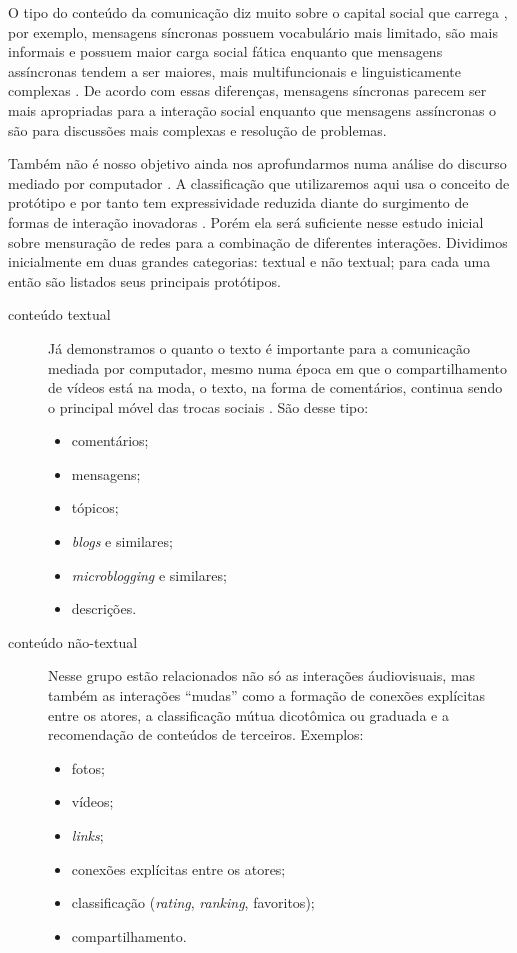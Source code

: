O tipo do conteúdo da comunicação diz muito sobre o capital social que carrega
\citep{Kim2007}, por exemplo, mensagens síncronas possuem vocabulário mais
limitado, são mais informais e possuem maior carga social fática
\citep{Danet1998, Ko1996, WERRY1996} enquanto que mensagens assíncronas tendem a
ser maiores, mais multifuncionais e linguisticamente complexas
\citep{Herring1999}. De acordo com essas diferenças, mensagens síncronas parecem
ser mais apropriadas para a interação social enquanto que mensagens assíncronas o
são para discussões mais complexas e resolução de problemas.

Também não é nosso objetivo ainda nos aprofundarmos numa análise do discurso
mediado por computador \citep{Herring2001}. A classificação que utilizaremos aqui
usa o conceito de protótipo e por tanto tem expressividade reduzida diante do
surgimento de formas de interação inovadoras \citep{Herring2007}. Porém ela será
suficiente nesse estudo inicial sobre mensuração de redes para a combinação de
diferentes interações. Dividimos inicialmente em duas grandes categorias: textual
e não textual; para cada uma então são listados seus principais protótipos.

\begin{description}
\item[conteúdo textual] Já demonstramos o quanto o texto é importante para a
comunicação mediada por computador, mesmo numa época em que o compartilhamento
de vídeos está na moda, o texto, na forma de comentários, continua sendo o
principal móvel das trocas sociais \citep{Herring2002}. São desse tipo:
\begin{itemize}
  \item comentários;
  \item mensagens;
  \item tópicos;
  \item \emph{blogs} e similares;
  \item \emph{microblogging} e similares;
  \item descrições.
\end{itemize}
\item[conteúdo não-textual] Nesse grupo estão relacionados não só as interações
áudiovisuais, mas também as interações ``mudas'' como a formação de conexões
explícitas entre os atores, a classificação mútua dicotômica ou graduada e a
recomendação de conteúdos de terceiros. Exemplos:
\begin{itemize}
  \item fotos;
  \item vídeos;
  \item \emph{links};
  \item conexões explícitas entre os atores;
  \item classificação (\emph{rating}, \emph{ranking}, favoritos);
  \item compartilhamento.
\end{itemize}
\end{description}

